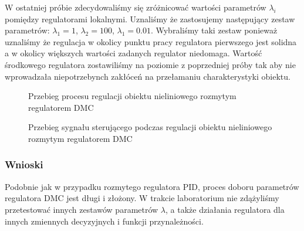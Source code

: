 \indent{}
W ostatniej próbie zdecydowaliśmy się zróżnicować wartości parametrów $\lambda_{i}$ pomiędzy regulatorami 
lokalnymi. Uznaliśmy że zastosujemy następujący zestaw parametrów: $\lambda_{1} = \num{1}$, $\lambda_{2} = \num{100}$,
$\lambda_{1} = \num{0.01}$. Wybraliśmy taki zestaw ponieważ uznaliśmy że regulacja w okolicy punktu pracy regulatora
pierwszego jest solidna a w okolicy większych wartości zadanych regulator niedomaga. Wartość środkowego
regulatora zostawiliśmy na poziomie z poprzedniej próby tak aby nie wprowadzała niepotrzebynch zakłóceń 
na przełamaniu charakterystyki obiektu.

\begin{figure}[t]
    \centering
    \caption{Przebieg procesu regulacji obiektu nieliniowego rozmytym regulatorem DMC}
    \label{dr_3_y}
\end{figure}

\begin{figure}[b]
    \centering
    \caption{Przebieg sygnału sterującego podczas regulacji obiektu nieliniowego rozmytym regulatorem DMC}
    \label{dr_3_u}
\end{figure}

\subsubsection{Wnioski}
Podobnie jak w przypadku rozmytego regulatora PID, proces doboru parametrów regulatora DMC jest długi i złożony.
W trakcie laboratorium nie zdążyliśmy przetestować innych zestawów parametrów $\lambda$, a także działania
regulatora dla innych zmiennych decyzyjnych i funkcji przynależności.